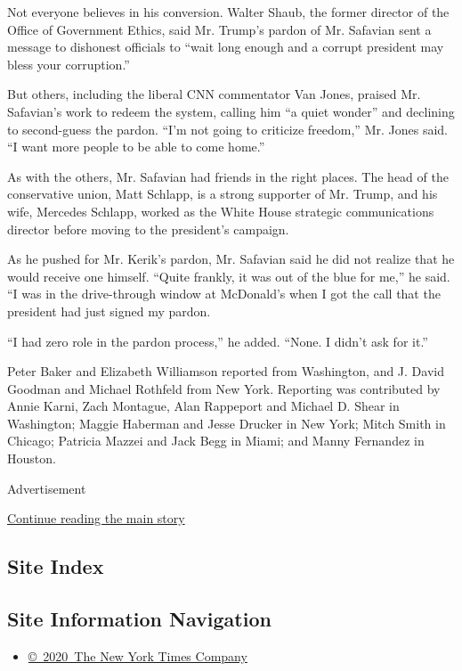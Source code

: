 Not everyone believes in his conversion. Walter Shaub, the former
director of the Office of Government Ethics, said Mr. Trump's pardon of
Mr. Safavian sent a message to dishonest officials to ``wait long enough
and a corrupt president may bless your corruption.''

But others, including the liberal CNN commentator Van Jones, praised Mr.
Safavian's work to redeem the system, calling him ``a quiet wonder'' and
declining to second-guess the pardon. ``I'm not going to criticize
freedom,'' Mr. Jones said. ``I want more people to be able to come
home.''

As with the others, Mr. Safavian had friends in the right places. The
head of the conservative union, Matt Schlapp, is a strong supporter of
Mr. Trump, and his wife, Mercedes Schlapp, worked as the White House
strategic communications director before moving to the president's
campaign.

As he pushed for Mr. Kerik's pardon, Mr. Safavian said he did not
realize that he would receive one himself. ``Quite frankly, it was out
of the blue for me,'' he said. ``I was in the drive-through window at
McDonald's when I got the call that the president had just signed my
pardon.

``I had zero role in the pardon process,'' he added. ``None. I didn't
ask for it.''

Peter Baker and Elizabeth Williamson reported from Washington, and J.
David Goodman and Michael Rothfeld from New York. Reporting was
contributed by Annie Karni, Zach Montague, Alan Rappeport and Michael D.
Shear in Washington; Maggie Haberman and Jesse Drucker in New York;
Mitch Smith in Chicago; Patricia Mazzei and Jack Begg in Miami; and
Manny Fernandez in Houston.

Advertisement

\protect\hyperlink{after-bottom}{Continue reading the main story}

\hypertarget{site-index}{%
\subsection{Site Index}\label{site-index}}

\hypertarget{site-information-navigation}{%
\subsection{Site Information
Navigation}\label{site-information-navigation}}

\begin{itemize}
\tightlist
\item
  \href{https://help.nytimes.com/hc/en-us/articles/115014792127-Copyright-notice}{©~2020~The
  New York Times Company}
\end{itemize}

